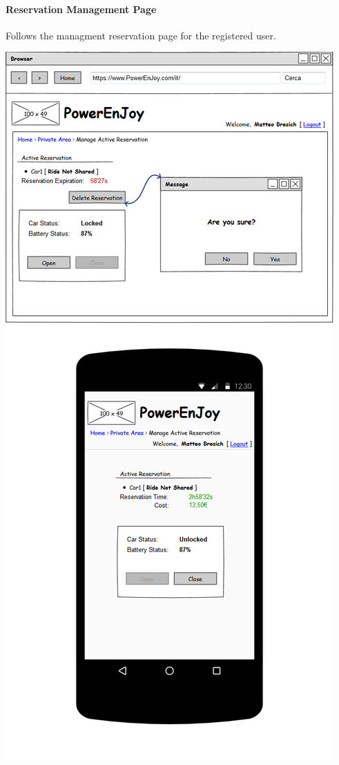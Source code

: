 \paragraph{Reservation Management Page} Follows the managment reservation page for the registered user.
\begin{center}
	\includegraphics[width=0.6\linewidth]{"img/ui/delete-reservation"}
\end{center}
\pagebreak

